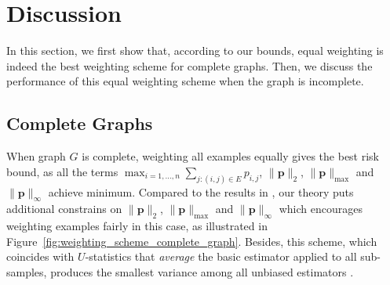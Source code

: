 \documentclass[letterpaper]{article} %
\newcommand{\probdistri}{\mathbf{p}}
\newcommand{\pair}[1]{(#1)}
\newcommand{\citep}[3]{(#1\ \citeauthor{#3}\ \citeyear{#3},\ #2)}
\begin{document}


\section{Discussion} %
\label{sec:discussion}
In this section, we first show that, according to our bounds, equal weighting is indeed the best weighting scheme for complete graphs. 
Then, we discuss the performance of this equal weighting scheme when the graph is incomplete. %

\subsection{Complete Graphs} %
\label{sub:complete_graph}
When graph $G$ is complete, weighting all examples equally gives the best risk bound, as all the terms $\max_{i=1,\dots,n} \sum_{j:\pair{i,j}\in E} p_{i,j}$, $\|\probdistri{}\|_2$, $\|\probdistri{}\|_\max$ and $\|\probdistri{}\|_\infty$ achieve minimum. 
Compared to the results in \cite{wang2017learning}, our theory puts additional constrains on $\|\probdistri{}\|_2$, $\|\probdistri{}\|_\max$ and $\|\probdistri{}\|_\infty$ which encourages weighting examples fairly in this case, as illustrated in Figure~\ref{fig:weighting_scheme_complete_graph}. 
Besides, this scheme, which coincides with $U$-statistics that \emph{average} the basic estimator applied to all sub-samples, produces the smallest variance among all unbiased estimators \cite{hoeffding1948class}. 
\end{document}
